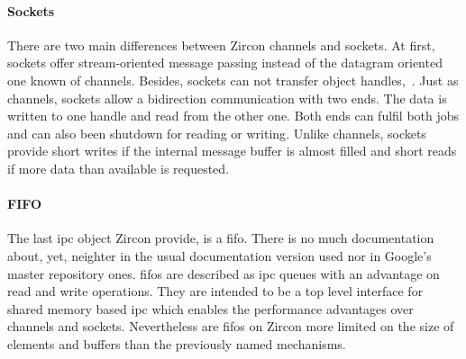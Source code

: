 %
%
%
%
%

\paragraph{Sockets}
There are two main differences between Zircon channels and sockets.
At first, sockets offer stream-oriented message passing instead of the datagram oriented one known of channels.
Besides, sockets can not transfer object handles\cite{zircon-concepts},~\cite{zircon-socket}.
Just as channels, sockets allow a bidirection communication with two ends.
The data is written to one handle and read from the other one. 
Both ends can fulfil both jobs and can also been shutdown for reading or writing\cite{zircon-socket}.
Unlike channels, sockets provide short writes if the internal message buffer is almost filled and short reads if more data than available is requested\cite{zircon-concepts}.

%
%
%

\paragraph{FIFO}
The last \ac{ipc} object Zircon provide, is a \ac{fifo}.
There is no much documentation about, yet, neighter in the usual documentation version used nor in Google's master repository ones.
\acp{fifo} are described as \ac{ipc} queues with an advantage on read and write operations.
They are intended to be a top level interface for shared memory based \ac{ipc} which enables the performance advantages over channels and sockets.
Nevertheless are \acp{fifo} on Zircon more limited on the size of elements and buffers than the previously named mechanisms\cite{zircon-fifo}.

